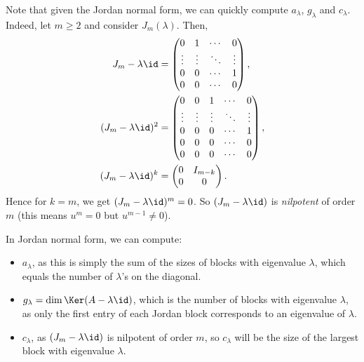 \documentclass[12pt]{article}
\begin{document}
Note that given the Jordan normal form, we can quickly compute $a_{\lambda}$, $g_{\lambda}$ and $c_{\lambda}$. Indeed, let $m \geq 2$ and consider $J_m(\lambda)$. Then,
\begin{align*}
	J_m - \lambda \id &= 
	\begin{pmatrix}
		0 & 1 & \cdots & 0 \\
		\vdots & \vdots & \ddots & \vdots \\
		0 & 0 & \cdots & 1 \\
		0 & 0 & \cdots & 0
	\end{pmatrix}, \\
	(J_m - \lambda \id)^2 &=
	\begin{pmatrix}
		0 & 0 & 1 & \cdots & 0 \\
		\vdots & \vdots & \vdots & \ddots & \vdots \\
		0 & 0 & 0 & \cdots & 1 \\
		0 & 0 & 0 & \cdots & 0 \\
		0 & 0 & 0 & \cdots & 0
	\end{pmatrix}, \\
	(J_m - \lambda \id)^{k} &=
	\begin{pmatrix}
		0 & I_{m-k} \\
		0 & 0
	\end{pmatrix}.
\end{align*}
Hence for $k = m$, we get $(J_m - \lambda \id)^{m} = 0$. So $(J_m - \lambda \id)$ is \textit{nilpotent} of order $m$ (this means $u^{m} = 0$ but $u^{m-1} \neq 0$).

In Jordan normal form, we can compute:
\begin{itemize}
	\item $a_{\lambda}$, as this is simply the sum of the sizes of blocks with eigenvalue $\lambda$, which equals the number of $\lambda$'s on the diagonal.
	\item $g_{\lambda} = \dim \Ker(A - \lambda \id)$, which is the number of blocks with eigenvalue $\lambda$, as only the first entry of each Jordan block corresponds to an eigenvalue of $\lambda$.
	\item $c_{\lambda}$, as $(J_m - \lambda \id)$ is nilpotent of order $m$, so $c_{\lambda}$ will be the size of the largest block with eigenvalue $\lambda$.
\end{itemize}
\end{document}
